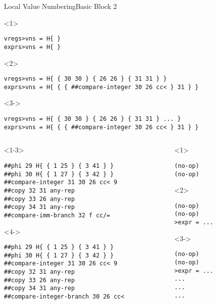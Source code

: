 \documentclass{beamer}
\begin{document}
\begin{frame}[fragile]{Local Value Numbering}{Basic Block 2}
  \begin{onlyenv}<1>
  \begin{Verbatim}
vregs>vns = H{ }
exprs>vns = H{ }
  \end{Verbatim}
  \end{onlyenv}
  \begin{onlyenv}<2>
  \begin{Verbatim}
vregs>vns = H{ { 30 30 } { 26 26 } { 31 31 } }
exprs>vns = H{ { { ##compare-integer 30 26 cc< } 31 } }
  \end{Verbatim}
  \end{onlyenv}
  \begin{onlyenv}<3->
  \begin{Verbatim}
vregs>vns = H{ { 30 30 } { 26 26 } { 31 31 } ... }
exprs>vns = H{ { { ##compare-integer 30 26 cc< } 31 } }
  \end{Verbatim}
  \end{onlyenv}
  \begin{columns}[t,onlytextwidth]
    \begin{column}[t]{.6\textwidth}
      \begin{onlyenv}<1-3>
      \begin{Verbatim}[frame=single]
##phi 29 H{ { 1 25 } { 3 41 } }
##phi 30 H{ { 1 27 } { 3 42 } }
##compare-integer 31 30 26 cc< 9
##copy 32 31 any-rep
##copy 33 26 any-rep
##copy 34 31 any-rep
##compare-imm-branch 32 f cc/=
      \end{Verbatim}
      \end{onlyenv}
      \begin{onlyenv}<4->
      \begin{Verbatim}[frame=single]
##phi 29 H{ { 1 25 } { 3 41 } }
##phi 30 H{ { 1 27 } { 3 42 } }
##compare-integer 31 30 26 cc< 9
##copy 32 31 any-rep
##copy 33 26 any-rep
##copy 34 31 any-rep
##compare-integer-branch 30 26 cc<
      \end{Verbatim}
      \end{onlyenv}
    \end{column}

    \begin{column}[t]{.3\textwidth}
      \begin{onlyenv}<1>
        \begin{Verbatim}
(no-op)
(no-op)
        \end{Verbatim}
      \end{onlyenv}
      \begin{onlyenv}<2>
        \begin{Verbatim}
(no-op)
(no-op)
>expr = ...
        \end{Verbatim}
      \end{onlyenv}
      \begin{onlyenv}<3->
        \begin{Verbatim}
(no-op)
(no-op)
>expr = ...
...
...
...
        \end{Verbatim}
      \end{onlyenv}
    \end{column}
  \end{columns}
\end{frame}
\end{document}
